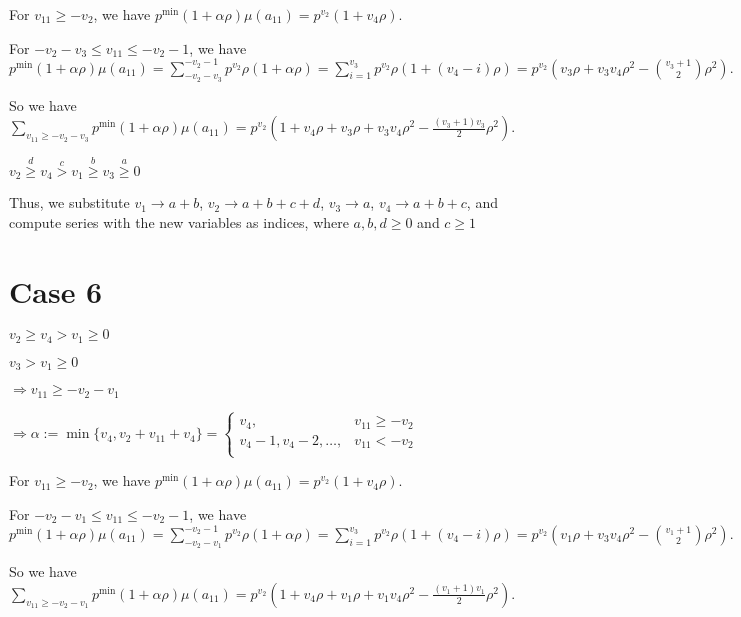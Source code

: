 \documentclass{article}
\begin{document}
For $v_{11}\geq{-v_2}$, we have $p^{\min}(1+\alpha\rho)\mu(a_{11})=p^{v_2}(1+v_4\rho).$

For $-v_2-v_3\leq{v_{11}}\leq{-v_2-1}$, we have $p^{\min}(1+\alpha\rho)\mu(a_{11})=\sum_{-v_2-v_3}^{-v_2-1}p^{v_2}\rho(1+\alpha\rho)=\sum_{i=1}^{v_3}p^{v_2}\rho(1+(v_4-i)\rho)=p^{v_2}(v_3\rho+v_3v_4\rho^2-\binom{v_3+1}{2}\rho^2).$

So we have $\sum_{v_{11}\geq{-v_2-v_3}}p^{\min}(1+\alpha\rho)\mu(a_{11})=p^{v_2}(1+v_4\rho+v_3\rho+v_3v_4\rho^2-\frac{(v_3+1)v_3}{2}\rho^2).$

$v_2\overset{d}{\geq}v_4\overset{c}{>}v_1\overset{b}{\geq}{v_3}\overset{a}{\geq}{0}$

Thus, we substitute $v_1\rightarrow{a+b}$, $v_2\rightarrow{a+b+c+d}$, $v_3\rightarrow{a}$, $v_4\rightarrow{a+b+c}$, and compute series with the new variables as indices, where $a,b,d\geq{0}$ and $c\geq{1}$
\section{Case 6}
$v_2\geq{v_4}>v_1\geq{0}$

$v_3>v_1\geq{0}$

$\Rightarrow{v_{11}}\geq{-v_2-v_1}$

$\Rightarrow\alpha:=\min\{v_4,v_2+v_{11}+v_4\}=\begin{cases}
       v_4, & v_{11}\geq{-v_2}\\
       v_4-1,v_4-2,\dots, & v_{11}<{-v_2}\\
     \end{cases}$

For $v_{11}\geq{-v_2}$, we have $p^{\min}(1+\alpha\rho)\mu(a_{11})=p^{v_2}(1+v_4\rho).$

For $-v_2-v_1\leq{v_{11}}\leq{-v_2-1}$, we have $p^{\min}(1+\alpha\rho)\mu(a_{11})=\sum_{-v_2-v_1}^{-v_2-1}p^{v_2}\rho(1+\alpha\rho)=\sum_{i=1}^{v_3}p^{v_2}\rho(1+(v_4-i)\rho)=p^{v_2}(v_1\rho+v_3v_4\rho^2-\binom{v_1+1}{2}\rho^2).$

So we have $\sum_{v_{11}\geq{-v_2-v_1}}p^{\min}(1+\alpha\rho)\mu(a_{11})=p^{v_2}(1+v_4\rho+v_1\rho+v_1v_4\rho^2-\frac{(v_1+1)v_1}{2}\rho^2).$
\end{document}
